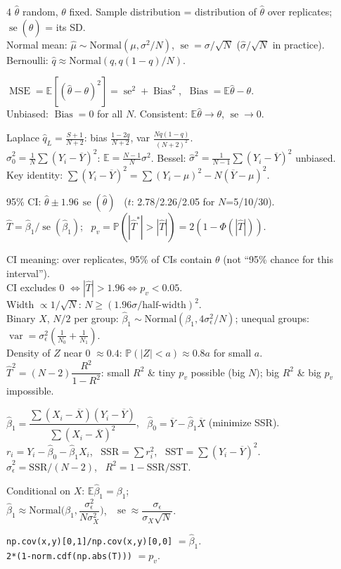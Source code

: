 \documentclass[11pt]{article}
\newcommand{\E}{\mathbb{E}}
\newcommand{\Var}{\operatorname{var}}
\newcommand{\se}{\operatorname{se}}
\newcommand{\MSE}{\operatorname{MSE}}
\newcommand{\Bias}{\operatorname{Bias}}
\renewcommand{\P}{\mathbb{P}}
\newcommand{\Norm}{\text{Normal}}
\newcommand{\SSR}{\mathrm{SSR}}
\newcommand{\SST}{\mathrm{SST}}
\newcommand{\py}[1]{\texttt{#1}}
\newcommand{\Ybar}{\overline{Y}}
\newcommand{\Xbar}{\overline{X}}
\begin{document}
\begin{landscape}
\begin{multicols}{4}
$\hat\theta$ random, $\theta$ fixed. Sample distribution = distribution of $\hat\theta$ over replicates; $\se(\hat\theta)$ = its SD.\\
Normal mean: $\hat\mu\sim\Norm(\mu,\sigma^2/N)$, $\se=\sigma/\sqrt N$ ($\hat\sigma/\sqrt N$ in practice).\\
Bernoulli: $\hat q\approx\Norm(q,q(1-q)/N)$.
\begin{cbox}
$\MSE=\E[(\hat\theta-\theta)^2]=\se^2+\Bias^2$, $\ \Bias=\E\hat\theta-\theta$.\\
Unbiased: $\Bias=0$ for all $N$. Consistent: $\E\hat\theta\to\theta$, $\se\to0$.
\end{cbox}
Laplace $\hat q_L=\frac{S+1}{N+2}$: bias $\frac{1-2q}{N+2}$, var $\frac{Nq(1-q)}{(N+2)^2}$.\\
$\hat\sigma_0^2=\frac1N\sum(Y_i-\Ybar)^2$: $\E=\frac{N-1}N\sigma^2$. Bessel: $\hat\sigma^2=\frac1{N-1}\sum(Y_i-\Ybar)^2$ unbiased.\\
Key identity: $\sum(Y_i-\Ybar)^2=\sum(Y_i-\mu)^2-N(\Ybar-\mu)^2$.


\columnbreak
{}
\begin{cbox}
95\% CI: $\hat\theta\pm1.96\,\se(\hat\theta)$ \ ($t$: 2.78/2.26/2.05 for $N$=5/10/30).\\
$\hat T=\hat\beta_1/\se(\hat\beta_1)$; \ $p_v=\P(|\hat T^*|>|\hat T|)=2(1-\Phi(|\hat T|))$.
\end{cbox}
CI meaning: over replicates, 95\% of CIs contain $\theta$ (not ``95\% chance for this interval'').\\
CI excludes 0 $\iff|\hat T|>1.96\iff p_v<0.05$.\\
Width $\propto1/\sqrt N$: $N\ge(1.96\sigma/\text{half-width})^2$.\\
Binary $X$, $N/2$ per group: $\hat\beta_1\sim\Norm(\beta_1,4\sigma_\epsilon^2/N)$; unequal groups: $\Var=\sigma_\epsilon^2(\frac1{N_0}+\frac1{N_1})$.\\
Density of $Z$ near 0 $\approx0.4$: $\P(|Z|<a)\approx0.8a$ for small $a$.\\
$\hat T^2=(N-2)\dfrac{R^2}{1-R^2}$: small $R^2$ \& tiny $p_v$ possible (big $N$); big $R^2$ \& big $p_v$ impossible.

$\hat\beta_1=\dfrac{\sum(X_i-\Xbar)(Y_i-\Ybar)}{\sum(X_i-\Xbar)^2}$, \ $\hat\beta_0=\Ybar-\hat\beta_1\Xbar$ (minimize SSR).\\
$r_i=Y_i-\hat\beta_0-\hat\beta_1X_i$, \ $\SSR=\sum r_i^2$, \ $\SST=\sum(Y_i-\Ybar)^2$.\\
$\hat\sigma_\epsilon^2=\SSR/(N-2)$, \ $R^2=1-\SSR/\SST$.
\begin{cbox}
Conditional on $X$: $\E\hat\beta_1=\beta_1$;\\
$\hat\beta_1\approx\Norm\!\Big(\beta_1,\dfrac{\sigma_\epsilon^2}{N\sigma_X^2}\Big)$, \ $\se\approx\dfrac{\sigma_\epsilon}{\sigma_X\sqrt N}$.
\end{cbox}
\py{np.cov(x,y)[0,1]/np.cov(x,y)[0,0]} $=\hat\beta_1$.\\
\py{2*(1-norm.cdf(np.abs(T)))} $=p_v$.



\end{multicols}
\end{landscape}
\end{document}
